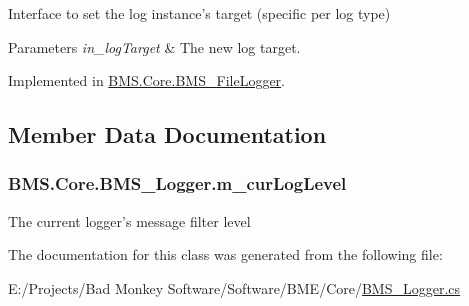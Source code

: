 Interface to set the log instance's target (specific per log type) 


\begin{DoxyParams}{Parameters}
{\em in\-\_\-log\-Target} & The new log target.\\
\hline
\end{DoxyParams}


Implemented in \hyperlink{class_b_m_s_1_1_core_1_1_b_m_s___file_logger_ae3a4548c9a583b12773e5c36d3043b87}{B\-M\-S.\-Core.\-B\-M\-S\-\_\-\-File\-Logger}.



\subsection{Member Data Documentation}
\hypertarget{class_b_m_s_1_1_core_1_1_b_m_s___logger_a2a89bc725b72e530c7cb1d8ceb44e74c}{
\subsubsection[{m\-\_\-cur\-Log\-Level}]{ B\-M\-S.\-Core.\-B\-M\-S\-\_\-\-Logger.\-m\-\_\-cur\-Log\-Level\hspace{0.3cm}{\ttfamily [protected]}}}\label{class_b_m_s_1_1_core_1_1_b_m_s___logger_a2a89bc725b72e530c7cb1d8ceb44e74c}


The current logger's message filter level 



The documentation for this class was generated from the following file\-:\begin{DoxyCompactItemize}
\item 
E\-:/\-Projects/\-Bad Monkey Software/\-Software/\-B\-M\-E/\-Core/\hyperlink{_b_m_s___logger_8cs}{B\-M\-S\-\_\-\-Logger.\-cs}\end{DoxyCompactItemize}
